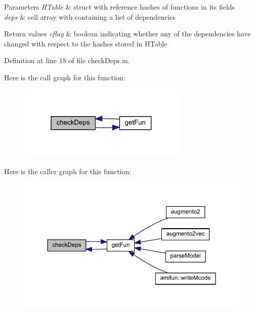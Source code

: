 \begin{DoxyParams}{Parameters}
{\em H\+Table} & struct with reference hashes of functions in its fields\\
\hline
{\em deps} & cell array with containing a list of dependencies\\
\hline
\end{DoxyParams}

\begin{DoxyRetVals}{Return values}
{\em cflag} & boolean indicating whether any of the dependencies have changed with respect to the hashes stored in H\+Table \\
\hline
\end{DoxyRetVals}


Definition at line 18 of file check\+Deps.\+m.

Here is the call graph for this function\+:
\nopagebreak
\begin{figure}[H]
\begin{center}
\leavevmode
\includegraphics[width=229pt]{classamimodel_ab566026e57f6cbce21a2a2c72b9f7f2b_cgraph}
\end{center}
\end{figure}
Here is the caller graph for this function\+:
\nopagebreak
\begin{figure}[H]
\begin{center}
\leavevmode
\includegraphics[width=350pt]{classamimodel_ab566026e57f6cbce21a2a2c72b9f7f2b_icgraph}
\end{center}
\end{figure}
\mbox{\label{classamimodel_a93346c96338624e417ee9732ffd96b28}} 

